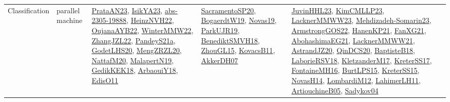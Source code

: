{\begin{longtable}{lp{3cm}>{\raggedright}p{6cm}>{\raggedright}p{6cm}p{8cm}}
Classification & parallel machine & \href{articles/PrataAN23.pdf}{PrataAN23}\cite{PrataAN23}, \href{articles/IsikYA23.pdf}{IsikYA23}\cite{IsikYA23}, \href{articles/abs-2305-19888.pdf}{abs-2305-19888}\cite{abs-2305-19888}, \href{articles/HeinzNVH22.pdf}{HeinzNVH22}\cite{HeinzNVH22}, \href{papers/OujanaAYB22.pdf}{OujanaAYB22}\cite{OujanaAYB22}, \href{papers/WinterMMW22.pdf}{WinterMMW22}\cite{WinterMMW22}, \href{papers/ZhangJZL22.pdf}{ZhangJZL22}\cite{ZhangJZL22}, \href{articles/PandeyS21a.pdf}{PandeyS21a}\cite{PandeyS21a}, \href{papers/GodetLHS20.pdf}{GodetLHS20}\cite{GodetLHS20}, \href{articles/MengZRZL20.pdf}{MengZRZL20}\cite{MengZRZL20}, \href{papers/NattafM20.pdf}{NattafM20}\cite{NattafM20}, \href{papers/MalapertN19.pdf}{MalapertN19}\cite{MalapertN19}, \href{articles/GedikKEK18.pdf}{GedikKEK18}\cite{GedikKEK18}, \href{papers/ArbaouiY18.pdf}{ArbaouiY18}\cite{ArbaouiY18}, \href{papers/EdisO11.pdf}{EdisO11}\cite{EdisO11} & \href{articles/SacramentoSP20.pdf}{SacramentoSP20}\cite{SacramentoSP20}, \href{papers/BogaerdtW19.pdf}{BogaerdtW19}\cite{BogaerdtW19}, \href{articles/Novas19.pdf}{Novas19}\cite{Novas19}, \href{papers/ParkUJR19.pdf}{ParkUJR19}\cite{ParkUJR19}, \href{papers/BenediktSMVH18.pdf}{BenediktSMVH18}\cite{BenediktSMVH18}, \href{papers/ZhouGL15.pdf}{ZhouGL15}\cite{ZhouGL15}, \href{articles/KovacsB11.pdf}{KovacsB11}\cite{KovacsB11}, \href{papers/AkkerDH07.pdf}{AkkerDH07}\cite{AkkerDH07} & \href{papers/JuvinHHL23.pdf}{JuvinHHL23}\cite{JuvinHHL23}, \href{papers/KimCMLLP23.pdf}{KimCMLLP23}\cite{KimCMLLP23}, \href{articles/LacknerMMWW23.pdf}{LacknerMMWW23}\cite{LacknerMMWW23}, \href{papers/Mehdizadeh-Somarin23.pdf}{Mehdizadeh-Somarin23}\cite{Mehdizadeh-Somarin23}, \href{papers/ArmstrongGOS22.pdf}{ArmstrongGOS22}\cite{ArmstrongGOS22}, \href{papers/HanenKP21.pdf}{HanenKP21}\cite{HanenKP21}, \href{articles/FanXG21.pdf}{FanXG21}\cite{FanXG21}, \href{articles/AbohashimaEG21.pdf}{AbohashimaEG21}\cite{AbohashimaEG21}, \href{papers/LacknerMMWW21.pdf}{LacknerMMWW21}\cite{LacknerMMWW21}, \href{articles/AstrandJZ20.pdf}{AstrandJZ20}\cite{AstrandJZ20}, \href{articles/QinDCS20.pdf}{QinDCS20}\cite{QinDCS20}, \href{articles/BaptisteB18.pdf}{BaptisteB18}\cite{BaptisteB18}, \href{articles/LaborieRSV18.pdf}{LaborieRSV18}\cite{LaborieRSV18}, \href{papers/KletzanderM17.pdf}{KletzanderM17}\cite{KletzanderM17}, \href{articles/KreterSS17.pdf}{KreterSS17}\cite{KreterSS17}, \href{papers/FontaineMH16.pdf}{FontaineMH16}\cite{FontaineMH16}, \href{papers/BurtLPS15.pdf}{BurtLPS15}\cite{BurtLPS15}, \href{papers/KreterSS15.pdf}{KreterSS15}\cite{KreterSS15}, \href{articles/NovasH14.pdf}{NovasH14}\cite{NovasH14}, \href{articles/LombardiM12.pdf}{LombardiM12}\cite{LombardiM12}, \href{papers/LahimerLH11.pdf}{LahimerLH11}\cite{LahimerLH11}, \href{papers/ArtiouchineB05.pdf}{ArtiouchineB05}\cite{ArtiouchineB05}, \href{papers/Sadykov04.pdf}{Sadykov04}\cite{Sadykov04}\\

\end{longtable}}
